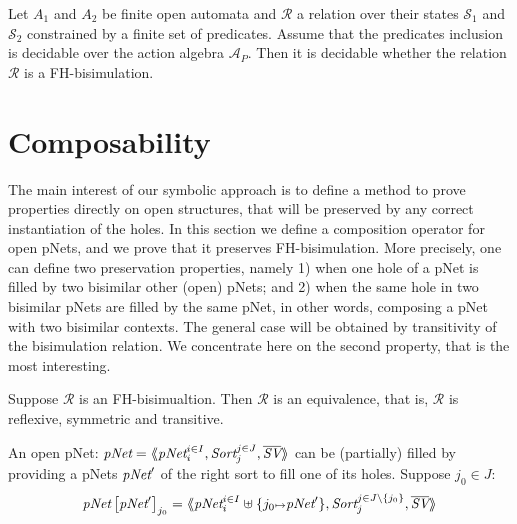\documentclass{lncs/llncs}
\begin{document}
\begin{theorem}
Let $A_1$ and $A_2$ be finite open automata
and $\mathcal{R}$ a relation over their states $\mathcal{S}_1$ and
$\mathcal{S}_2$ constrained by a finite set of predicates. Assume that
the predicates inclusion is decidable over  
the action algebra $\mathcal{A}_P$. Then it is decidable whether the relation 
$\mathcal{R}$ is a FH-bisimulation.
  
\end{theorem}




\section{Composability}

The main interest of our symbolic approach is to define a method to
prove properties directly on open structures, that will be preserved
by any correct instantiation of the holes. In this section we define a
composition operator for open pNets, and we prove that it preserves
FH-bisimulation. More precisely, one can define two preservation
properties, namely 1) when one hole of a pNet is filled by two bisimilar other (open) pNets; and 2) when the same hole in two bisimilar pNets are
filled by the same pNet, in other words, composing a pNet with two
bisimilar contexts. The general case will be obtained by
transitivity of the bisimulation relation. We concentrate here on the
second property, that is the most interesting.



\begin{theorem}\label{thm-equiv} Suppose $\mathcal{R}$ 
is an FH-bisimualtion. Then $\mathcal{R}$ is an equivalence, that is, $\mathcal{R}$ is 
reflexive, symmetric and transitive.

\end{theorem}



\begin{definition}
	An open pNet: $\pNet = \mylangle \pNet_i^{i\in I}, \Sort_j^{j\in J}, 
	\overline{\symb{SV}}\myrangle$
 can be (partially) filled by providing  a pNets $\pNet'$ of the
	right sort to fill one of  its holes.	
	Suppose $j_0\in J$:
	\[\pNet\left[\pNet'\right]_{j_0}= \mylangle 
	\pNet_i^{i\in I}\uplus\{j_0\mapsto \pNet'\},\Sort_j^{j\in J\setminus \{j_0\}},
	\overline{\symb{SV}}\myrangle
	\]
\end{definition}
\end{document}
